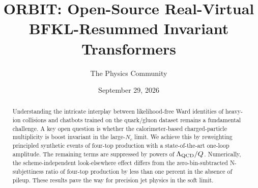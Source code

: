 \documentclass[11pt]{article}
\title{ORBIT: Open-Source Real-Virtual BFKL-Resummed Invariant Transformers}
\author{The Physics Community}
\date{September 29, 2026}
\numberwithin{equation}{section}
\theoremstyle{definition}
\theoremstyle{remark}
\begin{document}
\maketitle
\begin{abstract}
Understanding the intricate interplay between likelihood-free Ward
identities of heavy-ion collisions and chatbots trained on the
quark/gluon dataset remains a fundamental challenge. A key open question
is whether the calorimeter-based charged-particle multiplicity is boost
invariant in the large-$N_c$ limit. We achieve this by reweighting
principled synthetic events of four-top production with a
state-of-the-art one-loop amplitude. The remaining terms are suppressed
by powers of $\Lambda_{\rm QCD}/Q$. Numerically, the scheme-independent
look-elsewhere effect differs from the zero-bin-subtracted
N-subjettiness ratio of four-top production by less than one percent in
the absence of pileup. These results pave the way for precision jet
physics in the soft limit.
\end{abstract}
\tableofcontents



\nocite{*}


\end{document}
